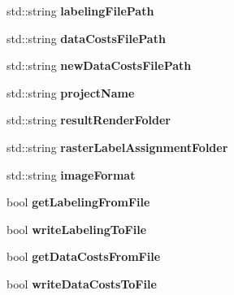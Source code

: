 \begin{DoxyCompactItemize}
\item 
\hypertarget{struct_arguments_ad753fef0a788c9868deb592ee39e0528}{}std\+::string {\bfseries labeling\+File\+Path}\label{struct_arguments_ad753fef0a788c9868deb592ee39e0528}

\item 
\hypertarget{struct_arguments_aaa04b2622a7712dd05c28101c149b116}{}std\+::string {\bfseries data\+Costs\+File\+Path}\label{struct_arguments_aaa04b2622a7712dd05c28101c149b116}

\item 
\hypertarget{struct_arguments_ae1b263850d63b7595ba4e6fd0ae525b3}{}std\+::string {\bfseries new\+Data\+Costs\+File\+Path}\label{struct_arguments_ae1b263850d63b7595ba4e6fd0ae525b3}

\item 
\hypertarget{struct_arguments_a5ce8b0bed244a327b762f2bb1630708b}{}std\+::string {\bfseries project\+Name}\label{struct_arguments_a5ce8b0bed244a327b762f2bb1630708b}

\item 
\hypertarget{struct_arguments_adadef95480756dd3922728cd40b8d334}{}std\+::string {\bfseries result\+Render\+Folder}\label{struct_arguments_adadef95480756dd3922728cd40b8d334}

\item 
\hypertarget{struct_arguments_aa7a9f7493548f0c58851e66601f8f64b}{}std\+::string {\bfseries raster\+Label\+Assignment\+Folder}\label{struct_arguments_aa7a9f7493548f0c58851e66601f8f64b}

\item 
\hypertarget{struct_arguments_af545eb82fb55577ba19adeeb5933e619}{}std\+::string {\bfseries image\+Format}\label{struct_arguments_af545eb82fb55577ba19adeeb5933e619}

\item 
\hypertarget{struct_arguments_ad2a5a8782138866eacf646d57b7ea531}{}bool {\bfseries get\+Labeling\+From\+File}\label{struct_arguments_ad2a5a8782138866eacf646d57b7ea531}

\item 
\hypertarget{struct_arguments_ac81dde9796306362b5c06f2d62a901ea}{}bool {\bfseries write\+Labeling\+To\+File}\label{struct_arguments_ac81dde9796306362b5c06f2d62a901ea}

\item 
\hypertarget{struct_arguments_a36e514162f0dca494ae8b558016fba23}{}bool {\bfseries get\+Data\+Costs\+From\+File}\label{struct_arguments_a36e514162f0dca494ae8b558016fba23}

\item 
\hypertarget{struct_arguments_a3f797aec500d79580f523addf2a62786}{}bool {\bfseries write\+Data\+Costs\+To\+File}\label{struct_arguments_a3f797aec500d79580f523addf2a62786}


\end{DoxyCompactItemize}
